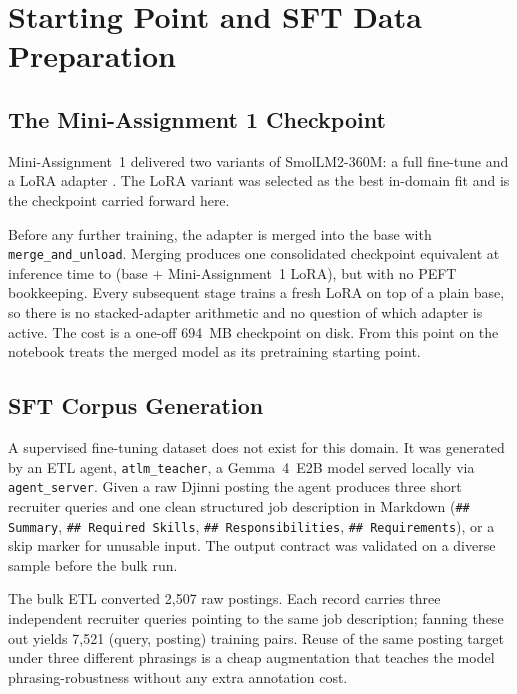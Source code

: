 \documentclass[../main.tex]{subfiles}
\begin{document}
\section{Starting Point and SFT Data Preparation}
\label{sec:starting_point}

\subsection{The Mini-Assignment 1 Checkpoint}
\label{sec:ma1_checkpoint}

Mini-Assignment~1 delivered two variants of SmolLM2-360M: a full fine-tune and a LoRA adapter \cite{hu2022lora}. The LoRA variant was selected as the best in-domain fit and is the checkpoint carried forward here.

Before any further training, the adapter is merged into the base with \texttt{merge\_and\_unload}. Merging produces one consolidated checkpoint equivalent at inference time to (base + Mini-Assignment~1 LoRA), but with no PEFT bookkeeping. Every subsequent stage trains a fresh LoRA on top of a plain base, so there is no stacked-adapter arithmetic and no question of which adapter is active. The cost is a one-off 694~MB checkpoint on disk. From this point on the notebook treats the merged model as its pretraining starting point.

\subsection{SFT Corpus Generation}
\label{sec:sft_data}

A supervised fine-tuning dataset does not exist for this domain. It was generated by an ETL agent, \texttt{atlm\_teacher}, a Gemma~4~E2B model served locally via \texttt{agent\_server}. Given a raw Djinni posting the agent produces three short recruiter queries and one clean structured job description in Markdown (\texttt{\#\# Summary}, \texttt{\#\# Required Skills}, \texttt{\#\# Responsibilities}, \texttt{\#\# Requirements}), or a skip marker for unusable input. The output contract was validated on a diverse sample before the bulk run.

The bulk ETL converted 2{,}507 raw postings. Each record carries three independent recruiter queries pointing to the same job description; fanning these out yields 7{,}521 (query, posting) training pairs. Reuse of the same posting target under three different phrasings is a cheap augmentation that teaches the model phrasing-robustness without any extra annotation cost.
\end{document}
